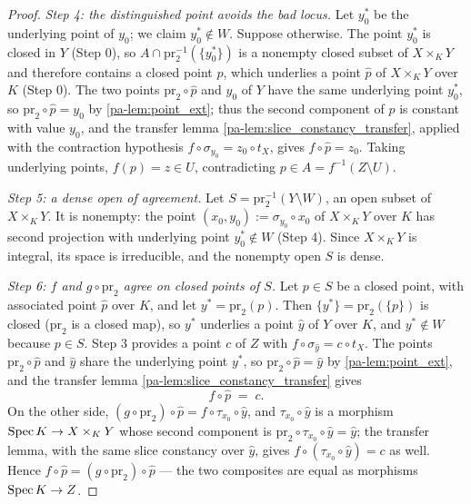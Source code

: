 \begin{proof}
  \emph{Step 4: the distinguished point avoids the bad locus.} Let \(y_0^*\) be the
  underlying point of \(y_0\); we claim \(y_0^* \notin W\). Suppose otherwise. The point
  \(y_0^*\) is closed in \(Y\) (Step 0), so
  \(A \cap \mathrm{pr}_2^{-1}(\{y_0^*\})\) is a nonempty closed subset of \(X \times_K Y\)
  and therefore contains a closed point \(p\), which underlies a point \(\hat p\) of
  \(X \times_K Y\) over \(K\) (Step 0). The two points \(\mathrm{pr}_2 \circ \hat p\) and
  \(y_0\) of \(Y\) have the same underlying point \(y_0^*\), so
  \(\mathrm{pr}_2 \circ \hat p = y_0\) by \ref{pa-lem:point_ext}; thus the second component of
  \(\hat p\) is constant with value \(y_0\), and the transfer lemma
  \ref{pa-lem:slice_constancy_transfer}, applied with the contraction hypothesis
  \(f \circ \sigma_{y_0} = z_0 \circ t_X\), gives \(f \circ \hat p = z_0\). Taking
  underlying points, \(f(p) = z \in U\), contradicting \(p \in A = f^{-1}(Z \setminus U)\).

  \emph{Step 5: a dense open of agreement.} Let
  \(S = \mathrm{pr}_2^{-1}(Y \setminus W)\), an open subset of \(X \times_K Y\). It is
  nonempty: the point \((x_0, y_0) := \sigma_{y_0} \circ x_0\) of \(X \times_K Y\) over
  \(K\) has second projection with underlying point \(y_0^* \notin W\) (Step 4). Since
  \(X \times_K Y\) is integral, its space is irreducible, and the nonempty open \(S\) is
  dense.

  \emph{Step 6: \(f\) and \(g \circ \mathrm{pr}_2\) agree on closed points of \(S\).} Let
  \(p \in S\) be a closed point, with associated point \(\hat p\) over \(K\), and let
  \(y^* = \mathrm{pr}_2(p)\). Then \(\{y^*\} = \mathrm{pr}_2(\{p\})\) is closed
  (\(\mathrm{pr}_2\) is a closed map), so \(y^*\) underlies a point \(\hat y\) of \(Y\) over
  \(K\), and \(y^* \notin W\) because \(p \in S\). Step 3 provides a point \(c\) of \(Z\)
  with \(f \circ \sigma_{\hat y} = c \circ t_X\). The points \(\mathrm{pr}_2 \circ \hat p\)
  and \(\hat y\) share the underlying point \(y^*\), so
  \(\mathrm{pr}_2 \circ \hat p = \hat y\) by \ref{pa-lem:point_ext}, and the transfer lemma
  \ref{pa-lem:slice_constancy_transfer} gives
  \[
    f \circ \hat p \;=\; c .
  \]
  On the other side, \((g \circ \mathrm{pr}_2) \circ \hat p = f \circ \tau_{x_0} \circ \hat y\),
  and \(\tau_{x_0} \circ \hat y\) is a morphism \(\operatorname{Spec} K \to X \times_K Y\) whose second
  component is \(\mathrm{pr}_2 \circ \tau_{x_0} \circ \hat y = \hat y\); the transfer lemma,
  with the same slice constancy over \(\hat y\), gives
  \(f \circ (\tau_{x_0} \circ \hat y) = c\) as well. Hence
  \(f \circ \hat p = (g \circ \mathrm{pr}_2) \circ \hat p\) — the two composites are equal
  as morphisms \(\operatorname{Spec} K \to Z\).


\end{proof}
